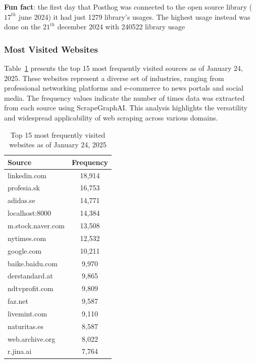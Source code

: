 \textbf{Fun fact}: the first day that Posthog was connected to the open source library ($17^{th}$ june 2024) it had just 1279 library's usages. The highest usage instead was done on the $21^{th}$ december 2024 with 240522 library usage

\subsubsection{Most Visited Websites}

Table~\ref{tab:most-visited-websites} presents the top 15 most frequently visited sources as of January 24, 2025. These websites represent a diverse set of industries, ranging from professional networking platforms and e-commerce to news portals and social media. The frequency values indicate the number of times data was extracted from each source using ScrapeGraphAI. This analysis highlights the versatility and widespread applicability of web scraping across various domains.

\begin{table}[H]
\centering
\begin{tabular}{|l|c|}
\hline
\textbf{Source}              & \textbf{Frequency} \\ \hline
linkedin.com                 & 18,914             \\ \hline
profesia.sk                  & 16,753             \\ \hline
adidas.se                    & 14,771             \\ \hline
localhost:8000               & 14,384             \\ \hline
m.stock.naver.com            & 13,508             \\ \hline
nytimes.com                  & 12,532             \\ \hline
google.com                   & 10,211             \\ \hline
baike.baidu.com              & 9,970              \\ \hline
derstandard.at               & 9,865              \\ \hline
ndtvprofit.com               & 9,809              \\ \hline
faz.net                      & 9,587              \\ \hline
livemint.com                 & 9,110              \\ \hline
naturitas.es                 & 8,587              \\ \hline
web.archive.org              & 8,022              \\ \hline
r.jina.ai                    & 7,764              \\ \hline
\end{tabular}
\caption{Top 15 most frequently visited websites as of January 24, 2025}
\label{tab:most-visited-websites}
\end{table}

